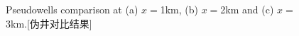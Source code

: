 \begin{figure}[!htbp]
    \centering
	{Pseudowells comparison at (a) $x=$1km, (b) $x=$2km
	and (c) $x=$3km.}[伪井对比结果]
    \label{fig:chouxian}
\end{figure}

